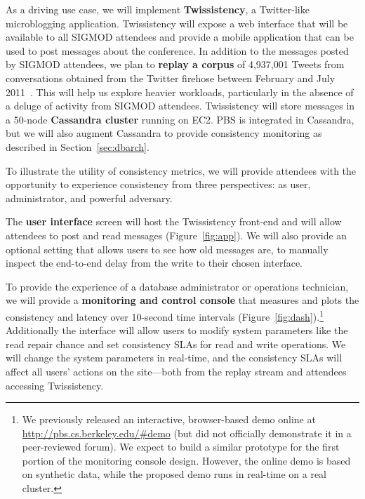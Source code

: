 
As a driving use case, we will implement \textbf{Twissistency}, a
Twitter-like microblogging application. Twissistency will expose a web
interface that will be available to all SIGMOD attendees and provide a
mobile application that can be used to post messages about the
conference. In addition to the messages posted by SIGMOD attendees, we
plan to \textbf{replay a corpus} of 4,937,001 Tweets from
conversations obtained from the Twitter firehose between February and
July 2011~\cite{ritter2010unsupervised}. This will help us explore
heavier workloads, particularly in the absence of a deluge of activity
from SIGMOD attendees. Twissistency will store messages in a 50-node
\textbf{Cassandra cluster} running on EC2. PBS is integrated in
Cassandra, but we will also augment Cassandra to provide consistency
monitoring as described in Section~\ref{sec:dbarch}.


To illustrate the utility of consistency metrics, we will provide
attendees with the opportunity to experience consistency from three
perspectives: as user, administrator, and powerful adversary.

The \textbf{user interface} screen will host the Twissistency
front-end and will allow attendees to post and read messages
(Figure~\ref{fig:app}). We will also provide an optional setting that
allows users to see how old messages are, to manually inspect the
end-to-end delay from the write to their chosen interface.

To provide the experience of a database administrator or operations
technician, we will provide a \textbf{monitoring and control console}
that measures and plots the consistency and latency over 10-second
time intervals (Figure~\ref{fig:dash}).\footnote{We previously
  released an interactive, browser-based demo online at
  \url{http://pbs.cs.berkeley.edu/#demo} (but did not officially
  demonstrate it in a peer-reviewed forum). We expect to build a
  similar prototype for the first portion of the monitoring console
  design. However, the online demo is based on synthetic data, while
  the proposed demo runs in real-time on a real cluster.} Additionally
the interface will allow users to modify system parameters like
the read repair chance and set consistency SLAs for read and write
operations. We will change the system parameters in real-time, and the
consistency SLAs will affect all users' actions on the site---both
from the replay stream and attendees accessing Twissistency.

